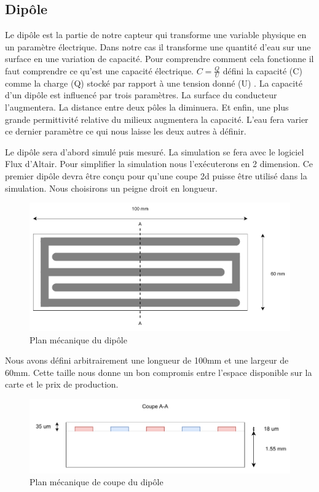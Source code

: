 \newpage
\subsection{Dipôle}
Le dipôle est la partie de notre capteur qui transforme une variable physique en un paramètre électrique. Dans notre cas il transforme une quantité d'eau sur une surface en une variation de capacité. Pour comprendre comment cela fonctionne il faut comprendre ce qu'est une capacité électrique. $C=\frac{Q}{U}$ défini la capacité (C) comme la charge (Q) stocké par rapport à une tension donné  (U) . La capacité d'un dipôle est influencé par trois paramètres. La surface du conducteur l'augmentera. La distance entre deux pôles la diminuera. Et enfin, une plus grande permittivité relative du milieux augmentera la capacité. L'eau fera varier ce dernier paramètre ce qui nous laisse les deux autres à définir.

Le dipôle sera d'abord simulé puis mesuré. La simulation se fera avec le logiciel Flux d'Altair. Pour simplifier la simulation nous l’exécuterons en 2 dimension. Ce premier dipôle devra être conçu pour qu'une coupe 2d puisse être utilisé dans la simulation. Nous choisirons un peigne droit en longueur. 

\begin{figure}[!ht]
 \centering
 \includegraphics[width=14cm]{dipole-top.pdf}
 \caption{Plan mécanique du dipôle}
 \label{plan}
\end{figure}

Nous avons défini arbitrairement une longueur de 100mm et une largeur de 60mm. Cette taille nous donne un bon compromis entre l'espace disponible sur la carte et le prix de production. 

\begin{figure}[!ht]
 \centering
 \includegraphics[width=14cm]{dipole-A-A.pdf}
 \caption{Plan mécanique de coupe du dipôle}
 \label{plancoupe}
\end{figure}

